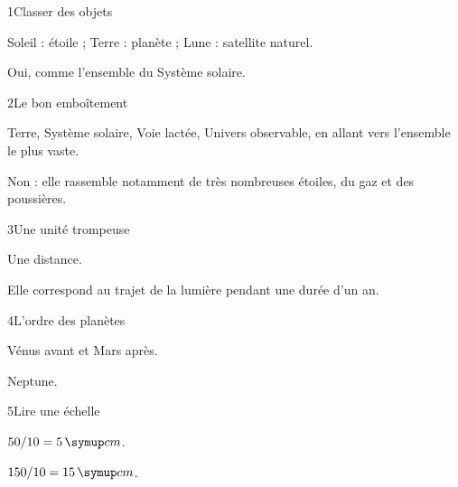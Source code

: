 \par\noindent\begin{minipage}{\linewidth}
\begin{corrige}{1}{Classer des objets}
\begin{questions}
\item Soleil : étoile ; Terre : planète ; Lune : satellite naturel.
\item Oui, comme l’ensemble du Système solaire.
\end{questions}
\end{corrige}
\end{minipage}
\par\noindent\begin{minipage}{\linewidth}
\begin{corrige}{2}{Le bon emboîtement}
\begin{questions}
\item Terre, Système solaire, Voie lactée, Univers observable, en allant vers l’ensemble le plus vaste.
\item Non : elle rassemble notamment de très nombreuses étoiles, du gaz et des poussières.
\end{questions}
\end{corrige}
\end{minipage}
\par\noindent\begin{minipage}{\linewidth}
\begin{corrige}{3}{Une unité trompeuse}
\begin{questions}
\item Une distance.
\item Elle correspond au trajet de la lumière pendant une durée d’un an.
\end{questions}
\end{corrige}
\end{minipage}
\par\noindent\begin{minipage}{\linewidth}
\begin{corrige}{4}{L’ordre des planètes}
\begin{questions}
\item Vénus avant et Mars après.
\item Neptune.
\end{questions}
\end{corrige}
\end{minipage}
\par\noindent\begin{minipage}{\linewidth}
\begin{corrige}{5}{Lire une échelle}
\begin{questions}
\item $50/10=5\unite{cm}$.
\item $150/10=15\unite{cm}$.
\end{questions}
\end{corrige}
\end{minipage}

